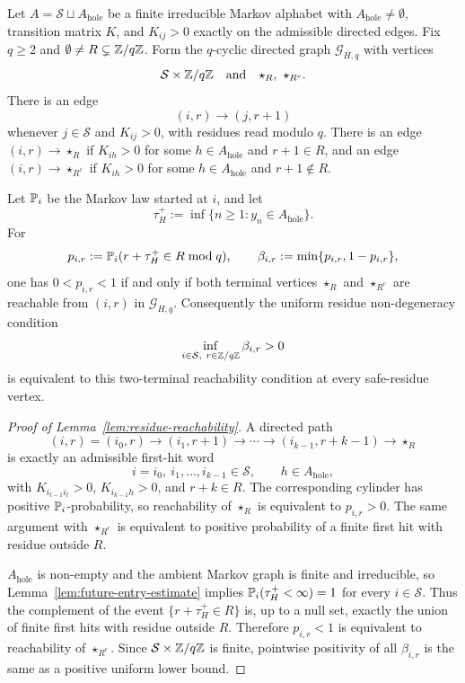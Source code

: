 \begin{lemma}
\label{lem:residue-reachability}
Let \(A=\mathcal S\sqcup A_{\mathrm{hole}}\) be a finite irreducible
Markov alphabet with \(A_{\mathrm{hole}}\neq\emptyset\), transition
matrix \(K\), and \(K_{ij}>0\) exactly on the admissible directed edges.
Fix \(q\geq2\) and
\(\emptyset\neq R\subsetneq\mathbb{Z}/q\mathbb{Z}\).  Form the \(q\)-cyclic directed
graph \(\mathcal G_{H,q}\) with vertices
\[
  \mathcal S\times\mathbb{Z}/q\mathbb{Z}
  \quad\text{and}\quad
  \star_R,\ \star_{R^c}.
\]
There is an edge
\[
  (i,r)\longrightarrow(j,r+1)
\]
whenever \(j\in\mathcal S\) and \(K_{ij}>0\), with residues read modulo
\(q\).  There is an edge \((i,r)\to\star_R\) if
\(K_{ih}>0\) for some \(h\in A_{\mathrm{hole}}\) and \(r+1\in R\), and
an edge \((i,r)\to\star_{R^c}\) if \(K_{ih}>0\) for some
\(h\in A_{\mathrm{hole}}\) and \(r+1\notin R\).

Let \(\mathbb{P}_i\) be the Markov law started at \(i\), and let
\[
  \tau_H^+:=\inf\{n\geq1:y_n\in A_{\mathrm{hole}}\}.
\]
For
\[
  p_{i,r}:=\mathbb{P}_i(r+\tau_H^+\in R\bmod q),
  \qquad
  \beta_{i,r}:=\min\{p_{i,r},1-p_{i,r}\},
\]
one has \(0<p_{i,r}<1\) if and only if both terminal vertices
\(\star_R\) and \(\star_{R^c}\) are reachable from \((i,r)\) in
\(\mathcal G_{H,q}\).  Consequently the uniform residue
non-degeneracy condition
\[
  \inf_{i\in\mathcal S,\ r\in\ZZ/q\ZZ}\beta_{i,r}>0
\]
is equivalent to this two-terminal reachability condition at every
safe-residue vertex.
\end{lemma}

\begin{proof}[Proof of Lemma~\ref{lem:residue-reachability}]
A directed path
\[
  (i,r)=(i_0,r)\to(i_1,r+1)\to\cdots
  \to(i_{k-1},r+k-1)\to\star_R
\]
is exactly an admissible first-hit word
\[
  i=i_0,\ i_1,\ldots,i_{k-1}\in\mathcal S,\qquad
  h\in A_{\mathrm{hole}},
\]
with \(K_{i_{t-1}i_t}>0\), \(K_{i_{k-1}h}>0\), and \(r+k\in R\).
The corresponding cylinder has positive \(\mathbb{P}_i\)-probability, so
reachability of \(\star_R\) is equivalent to \(p_{i,r}>0\).  The same
argument with \(\star_{R^c}\) is equivalent to positive probability of a
finite first hit with residue outside \(R\).

\(A_{\mathrm{hole}}\) is non-empty and the ambient Markov graph is
finite and irreducible, so Lemma~\ref{lem:future-entry-estimate}
implies \(\mathbb{P}_i(\tau_H^+<\infty)=1\) for every \(i\in\mathcal S\).
Thus the complement of the event \(\{r+\tau_H^+\in R\}\) is, up to a
null set, exactly the union of finite first hits with residue outside
\(R\).  Therefore \(p_{i,r}<1\) is equivalent to reachability of
\(\star_{R^c}\).  Since \(\mathcal S\times\mathbb{Z}/q\mathbb{Z}\) is finite,
pointwise positivity of all \(\beta_{i,r}\) is the same as a positive
uniform lower bound.
\end{proof}

